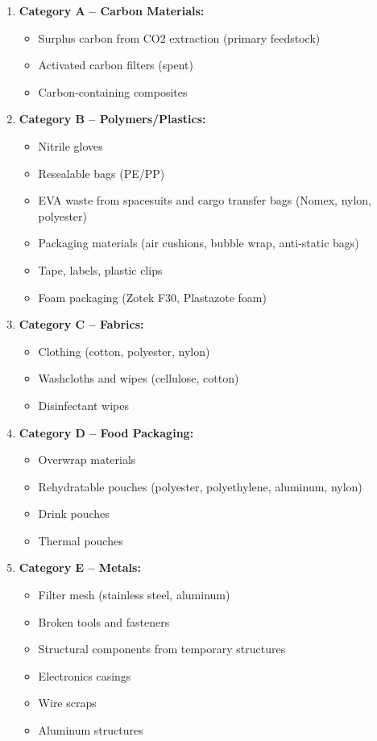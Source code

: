 \documentclass[12pt, a4paper]{article}
\begin{document}
\begin{enumerate}
    \item \textbf{Category A -- Carbon Materials:}
    \begin{itemize}
        \item Surplus carbon from CO2 extraction (primary feedstock)
        \item Activated carbon filters (spent)
        \item Carbon-containing composites
    \end{itemize}

    \item \textbf{Category B -- Polymers/Plastics:}
    \begin{itemize}
        \item Nitrile gloves
        \item Resealable bags (PE/PP)
        \item EVA waste from spacesuits and cargo transfer bags (Nomex, nylon, polyester)
        \item Packaging materials (air cushions, bubble wrap, anti-static bags)
        \item Tape, labels, plastic clips
        \item Foam packaging (Zotek F30, Plastazote foam)
    \end{itemize}

    \item \textbf{Category C -- Fabrics:}
    \begin{itemize}
        \item Clothing (cotton, polyester, nylon)
        \item Washcloths and wipes (cellulose, cotton)
        \item Disinfectant wipes 
    \end{itemize}

    \item \textbf{Category D -- Food Packaging:}
    \begin{itemize}
        \item Overwrap materials
        \item Rehydratable pouches (polyester, polyethylene, aluminum, nylon)
        \item Drink pouches
        \item Thermal pouches
    \end{itemize}

    \item \textbf{Category E -- Metals:}
    \begin{itemize}
        \item Filter mesh (stainless steel, aluminum)
        \item Broken tools and fasteners
        \item Structural components from temporary structures
        \item Electronics casings
        \item Wire scraps
        \item Aluminum structures
    \end{itemize}


\end{enumerate}
\end{document}
